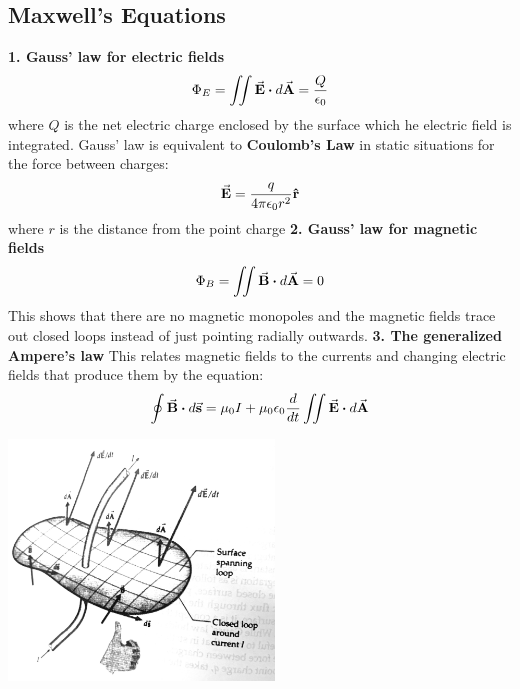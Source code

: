     \subsection{Maxwell's Equations}
        \textbf{1. Gauss' law for electric fields}
            \begin{equation*}
                \Phi_E = \iint \va{E} \vdot d\va{A} = \frac{Q}{\epsilon_0}
            \end{equation*}
            where $Q$ is the net electric charge enclosed by the surface which he electric field is integrated. Gauss' law is equivalent to \textbf{Coulomb's Law} in static situations for the force between charges:
            \begin{equation*}
                \va{E} = \frac{q}{4\pi\epsilon_0r^2}\vu{r}
            \end{equation*}
            where $r$ is the distance from the point charge
            \newline
        \textbf{2. Gauss' law for magnetic fields}
            \begin{equation*}
                \Phi_B = \iint \va{B} \vdot d\va{A} = 0
            \end{equation*}
            This shows that there are no magnetic monopoles and the magnetic fields trace out closed loops instead of just pointing radially outwards.
            \newline
        \textbf{3. The generalized Ampere's law}
            \newline
            This relates magnetic fields to the currents and changing electric fields that produce them by the equation:
            \begin{equation*}
                \oint \va{B} \vdot d\va{s} = \mu_0I + \mu_0\epsilon_0\frac{d}{dt}\iint \va{E} \vdot d\va{A}
            \end{equation*}
            \begin{center}
                \includegraphics[width=200pt]{ampereslaw.jpg}
            \end{center}
